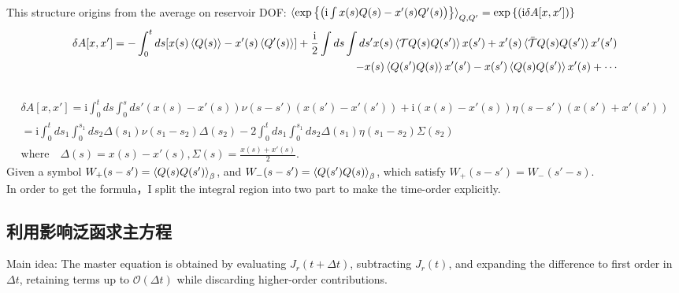 \documentclass{article}
\renewcommand{\exp}[1]{\operatorname{exp}\left\{#1\right\}}
\begin{document}
This structure origins from the average on reservoir DOF: $\braket{\exp{\left(\mathrm{i}\int x(s)Q(s)-x'(s)Q'(s)\right)}}_{Q,Q'}=\exp{(\mathrm{i}\delta A[x,x'])}$
    \begin{equation}
        \begin{split}
             \delta A[x,x']=-\int_0^t ds  [x(s)\braket{Q(s)}-x'(s)\braket{Q'(s)}]+\frac{\mathrm{i}}{2}\int ds\int ds' x(s)\braket{\mathcal{T}Q(s)Q(s')}x(s')+x'(s)\braket{\bar{\mathcal{T}}Q(s)Q(s')}x'(s')\\
        -x(s)\braket{Q(s')Q(s)}x'(s')-x(s')\braket{Q(s)Q(s')}x'(s)+\cdots\label{eq:influence functional}
        \end{split}
    \end{equation}
    \\
    \begin{equation}
        \begin{split}
             \delta A[x,x']=\mathrm{i}\int_0^t ds\int_0^s ds'(x(s)-x'(s))\nu(s-s')(x(s')-x'(s'))+\mathrm{i}(x(s)-x'(s))\eta(s-s')(x(s')+x'(s'))\\
        =\mathrm{i}\int_0^t ds_1\int_0^{s_1}ds_2\Delta(s_1)\nu(s_1-s_2)\Delta(s_2)-2\int_0^t ds_1\int_0^{s_1}ds_2\Delta(s_1)\eta(s_1-s
        _2)\Sigma(s_2)\\
        \text{where}\quad \Delta(s)=x(s)-x'(s),\Sigma(s)=\frac{x(s)+x'(s)}{2}.\label{eq:influence functional 1}
        \end{split}
    \end{equation}
Given a symbol $W_+(s-s')=\braket{Q(s) Q(s')}_\beta$, and $W_-(s-s')=\braket{Q(s') Q(s)}_\beta$, which satisfy $W_+(s-s')=W_-(s'-s)$.\\
In order to get the formula，I split the integral region into two part to make the time-order explicitly. 
\subsection{利用影响泛函求主方程}
Main idea:  The master equation is obtained by evaluating $J_r(t+\Delta t)$, subtracting $J_r(t)$, and expanding the difference to first order in $\Delta t$, retaining terms up to $\mathcal{O}(\Delta t)$ while discarding higher-order contributions.
\end{document}
